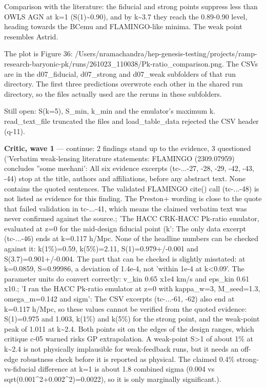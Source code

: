 \documentclass[11pt,a4paper]{article}
\begin{document}
Comparison with the literature: the fiducial and strong points suppress less than OWLS AGN at k=1 (S(1)\textasciitilde{}0.90), and by k\textasciitilde{}3.7 they reach the 0.89-0.90 level, heading towards the BCemu and FLAMINGO-like minima. The weak point resembles Astrid.

The plot is Figure 36: /Users/nramachandra/hep-genesis-testing/projects/ramp-research-baryonic-pk/runs/261023\_110038/Pk-ratio\_comparison.png. The CSVs are in the d07\_fiducial, d07\_strong and d07\_weak subfolders of that run directory. The first three predictions overwrote each other in the shared run directory, so the files actually used are the reruns in these subfolders.

Still open: S(k=5), S\_min, k\_min and the emulator's maximum k. read\_text\_file truncated the files and load\_table\_data rejected the CSV header (q-11).

\textbf{Critic, wave 1} --- continue: 2 findings stand up to the evidence, 3 questioned ('Verbatim weak-lensing literature statements: FLAMINGO (2309.07959) concludes ''some mechani': All six evidence excerpts (tc-...-27, -28, -29, -42, -43, -44) stop at the title, authors and affiliations, before any abstract text. None contains the quoted sentences. The validated FLAMINGO cite() call (tc-...-48) is not listed as evidence for this finding. The Preston+ wording is close to the quote that failed validation in tc-...-41, which means the claimed verbatim text was never confirmed against the source.; 'The HACC CRK-HACC Pk-ratio emulator, evaluated at z=0 for the mid-design fiducial point (k': The only data excerpt (tc-...-46) ends at k=0.117 h/Mpc. None of the headline numbers can be checked against it: k(1\%)=0.59, k(5\%)=2.11, S(1)=0.979+/-0.001 and S(3.7)=0.901+/-0.004. The part that can be checked is slightly misstated: at k=0.0859, S=0.99986, a deviation of 1.4e-4, not 'within 1e-4 at k\textless{}0.09'. The parameter units do convert correctly: v\_kin 0.65 x1e4 km/s and eps\_kin 0.61 x10.; 'I ran the HACC Pk-ratio emulator at z=0 with kappa\_w=3, M\_seed=1.3, omega\_m=0.142 and sigm': The CSV excerpts (tc-...-61, -62) also end at k=0.117 h/Mpc, so these values cannot be verified from the quoted evidence: S(1)=0.975 and 1.003, k(1\%) and k(5\%) for the strong point, and the weak-point peak of 1.011 at k\textasciitilde{}2.4. Both points sit on the edges of the design ranges, which critique c-05 warned risks GP extrapolation. A weak-point S\textgreater{}1 of about 1\% at k\textasciitilde{}2.4 is not physically implausible for weak-feedback runs, but it needs an off-edge robustness check before it is reported as physical. The claimed 0.4\% strong-vs-fiducial difference at k=1 is about 1.8 combined sigma (0.004 vs sqrt(0.001\textasciicircum{}2+0.002\textasciicircum{}2)=0.0022), so it is only marginally significant.).
\end{document}
